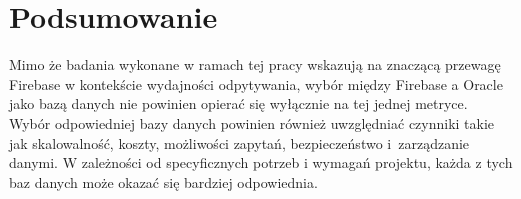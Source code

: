 \section{Podsumowanie}
Mimo że badania wykonane w ramach tej pracy wskazują na znaczącą przewagę Firebase w kontekście wydajności odpytywania, wybór między Firebase a Oracle jako bazą danych nie powinien opierać się wyłącznie na tej jednej metryce. Wybór odpowiedniej bazy danych powinien również uwzględniać czynniki takie jak skalowalność, koszty, możliwości zapytań, bezpieczeństwo i~zarządzanie danymi. W zależności od specyficznych potrzeb i wymagań projektu, każda z tych baz danych może okazać się bardziej odpowiednia.
